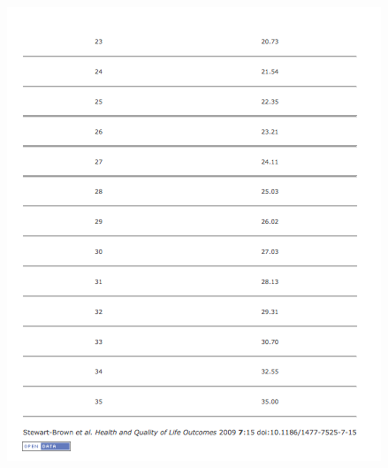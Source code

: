 \documentclass[11pt,openright,a4paper]{report}
\begin{document}
\begin{appendices}
\begin{figure}[ht]
  \centering
  \includegraphics[width =.7\textwidth]{i/swemwbsconversiontable2.png}
\end{figure}
\end{appendices}
\end{document}
